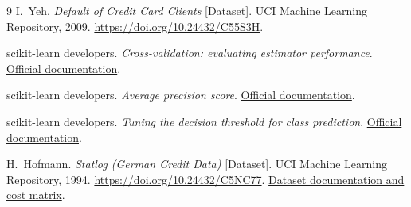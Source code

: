 \documentclass{article}
\begin{document}
\begin{thebibliography}{9}
\small
{}
I.~Yeh. \emph{Default of Credit Card Clients} [Dataset]. UCI Machine Learning Repository, 2009.
\url{https://doi.org/10.24432/C55S3H}.

scikit-learn developers. \emph{Cross-validation: evaluating estimator performance}.
\href{https://scikit-learn.org/stable/modules/cross_validation.html}{Official documentation}.

scikit-learn developers. \emph{Average precision score}.
\href{https://scikit-learn.org/stable/modules/generated/sklearn.metrics.average_precision_score.html}{Official documentation}.

scikit-learn developers. \emph{Tuning the decision threshold for class prediction}.
\href{https://scikit-learn.org/stable/modules/classification_threshold.html}{Official documentation}.

H.~Hofmann. \emph{Statlog (German Credit Data)} [Dataset]. UCI Machine Learning Repository, 1994.
\url{https://doi.org/10.24432/C5NC77}.
\href{https://archive.ics.uci.edu/dataset/144/statlog+german+credit+data}{Dataset documentation and cost matrix}.
\end{thebibliography}
\end{document}
